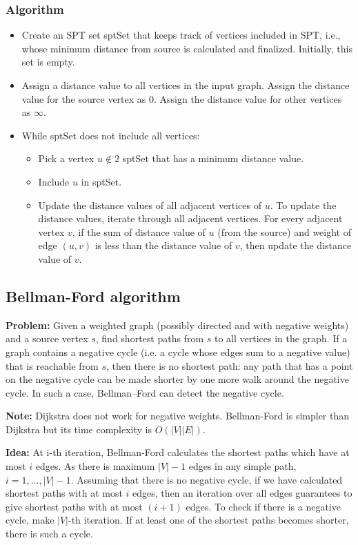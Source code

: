 \documentclass[a4paper,article,14pt]{extarticle}
\begin{document}
	\subsubsection{Algorithm}
	\begin{itemize}
		\item Create an SPT set sptSet that keeps track of vertices included in SPT, i.e., whose minimum distance from source is calculated and finalized. Initially, this set is empty.
		\item Assign a distance value to all vertices in the input graph. Assign the distance value for the source vertex as 0. Assign the distance value for other vertices as $\infty$.
		\item While sptSet does not include all vertices:
		\begin{itemize}
			\item Pick a vertex $u \notin 2$ sptSet that has a minimum distance value.
			\item Include $u$ in sptSet.
			\item Update the distance values of all adjacent vertices of $u$. To update the distance values, iterate through all adjacent vertices. For every adjacent vertex $v$, if the sum of distance value of $u$ (from the source) and weight of edge $(u, v)$ is less than the distance value of $v$, then update the distance value of $v$.
		\end{itemize}
	\end{itemize}
	\subsection{Bellman-Ford algorithm}
	\textbf{Problem:} Given a weighted graph (possibly directed and with negative weights)
	and a source vertex $s$, find shortest paths from $s$ to all vertices in the graph.
	If a graph contains a negative cycle (i.e. a cycle whose edges sum to a negative
	value) that is reachable from $s$, then there is no shortest path: any path that has
	a point on the negative cycle can be made shorter by one more walk around
	the negative cycle. In such a case, Bellman–Ford can detect the negative cycle.
	
	\textbf{Note:} Dijkstra does not work for negative weights. Bellman-Ford is simpler than
	Dijkstra but its time complexity is $O(|V||E|)$.
	
	\textbf{Idea:} At i-th iteration, Bellman-Ford calculates the shortest paths which have at
	most $i$ edges. As there is maximum $|V| - 1$ edges in any simple path,
	$i = 1,...,|V| - 1$. Assuming that there is no negative cycle, if we have
	calculated shortest paths with at most $i$ edges, then an iteration over all edges
	guarantees to give shortest paths with at most $(i + 1)$ edges. To check if there
	is a negative cycle, make $|V|$-th iteration. If at least one of the shortest paths
	becomes shorter, there is such a cycle.
	
\end{document}
